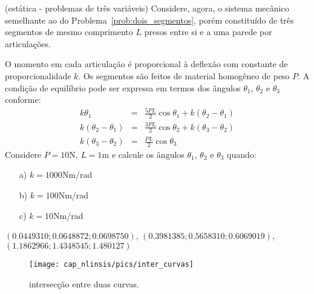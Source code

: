 \begin{exer}{(estática - problemas de três variáveis)} Considere, agora, o sistema mecânico semelhante ao do Problema~\ref{prob:dois_segmentos}, porém constituído de três segmentos de mesmo comprimento $L$ presos entre si e a uma parede por articulações.

O momento em cada articulação é proporcional à deflexão com constante de proporcionalidade $k$. Os segmentos são feitos de material homogêneo de peso $P$. A condição de equilíbrio pode ser expressa em termos dos ângulos $\theta_1$, $\theta_2$ e $\theta_3$ conforme:
\begin{eqnarray}
k\theta_1&=& \frac{5PL}{2}\cos\theta_1 + k\left(\theta_2-\theta_1\right)\\
k\left(\theta_2-\theta_1\right)&=& \frac{3PL}{2}\cos\theta_2+k\left(\theta_3-\theta_2\right)\\
k\left(\theta_3-\theta_2\right)&=& \frac{PL}{2}\cos\theta_3
\end{eqnarray}
Considere $P=10$N, $L=1$m e calcule os ângulos $\theta_1$, $\theta_2$ e $\theta_3$ quando:
\begin{itemize}
\item[a)] $k=1000$Nm/rad
\item[b)] $k=100$Nm/rad
\item[c)] $k=10$Nm/rad
\end{itemize}
\end{exer}
\begin{resp}
$\left(0.0449310; 0.0648872; 0.0698750  \right)$, $\left(0.3981385; 0.5658310; 0.6069019  \right)$, \\
$\left(1.1862966;1.4348545;1.480127  \right)$
\end{resp}

\begin{figure}
        \centering
	    \texttt{[image: cap\_nlinsis/pics/inter\_curvas]}
		\caption{intersecção entre duas curvas.}
		\label{pic:inter_curvas}
	\end{figure}

